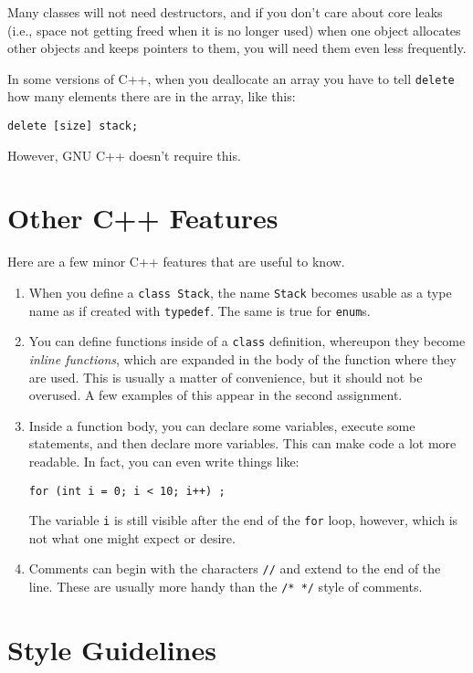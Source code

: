 \begin{enumerate}
Many classes will not need destructors, and if you don't care about
core leaks (i.e., space not getting freed when it is no longer used)
when one object allocates other objects and keeps pointers to them,
you will need them even less frequently.

In some versions of C++, when you deallocate an array you have to tell
{\tt delete} how many elements there are in the array, like this:
\begin{verbatim}
delete [size] stack;
\end{verbatim}
However, GNU C++ doesn't require this.

\end{enumerate}

\section{Other C++ Features}

Here are a few minor C++ features that are useful to know.
\begin{enumerate}
\item When you define a {\tt class Stack}, the name {\tt Stack} becomes
usable as a type name as if created with {\tt typedef}.  The same is
true for {\tt enum}s.
\item You can define functions inside of a {\tt class} definition,
whereupon they become {\it inline functions}, which are expanded in
the body of the function where they are used.  This is usually a
matter of convenience, but it should not be overused.  A few examples
of this appear in the second assignment.
\item Inside a function body, you can declare some variables, execute
some statements, and then declare more variables.  This can make code
a lot more readable.  In fact, you can even write things like:
\begin{verbatim}
for (int i = 0; i < 10; i++) ;
\end{verbatim}
The variable {\tt i} is still visible after the end of the {\tt for}
loop, however, which is not what one might expect or desire.
\item Comments can begin with the characters \verb+//+ and extend to
the end of the line.  These are usually more handy than the
\verb+/* */+ style of comments.
\end{enumerate}

\section{Style Guidelines}

